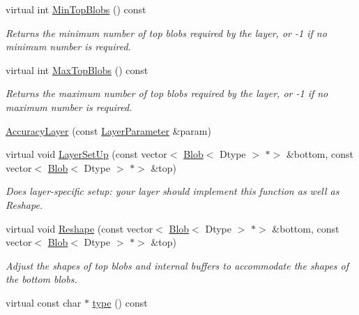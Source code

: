 \begin{DoxyCompactItemize}
virtual int \mbox{\hyperlink{classcaffe_1_1_accuracy_layer_a568dd59acff7a172fa614c88ac56aff7}{Min\+Top\+Blobs}} () const
\begin{DoxyCompactList}\small\item\em Returns the minimum number of top blobs required by the layer, or -\/1 if no minimum number is required. \end{DoxyCompactList}\item 
virtual int \mbox{\hyperlink{classcaffe_1_1_accuracy_layer_a7591ae6d50dd7d96b91241b5b0368997}{Max\+Top\+Blobs}} () const
\begin{DoxyCompactList}\small\item\em Returns the maximum number of top blobs required by the layer, or -\/1 if no maximum number is required. \end{DoxyCompactList}\item 
\mbox{\hyperlink{classcaffe_1_1_accuracy_layer_a362ab61d1961c1b408f84a956f6e598d}{Accuracy\+Layer}} (const \mbox{\hyperlink{classcaffe_1_1_layer_parameter}{Layer\+Parameter}} \&param)
\item 
virtual void \mbox{\hyperlink{classcaffe_1_1_accuracy_layer_a894a1fcb58e8f822f9d875e1acae560c}{Layer\+Set\+Up}} (const vector$<$ \mbox{\hyperlink{classcaffe_1_1_blob}{Blob}}$<$ Dtype $>$ $\ast$$>$ \&bottom, const vector$<$ \mbox{\hyperlink{classcaffe_1_1_blob}{Blob}}$<$ Dtype $>$ $\ast$$>$ \&top)
\begin{DoxyCompactList}\small\item\em Does layer-\/specific setup\+: your layer should implement this function as well as Reshape. \end{DoxyCompactList}\item 
virtual void \mbox{\hyperlink{classcaffe_1_1_accuracy_layer_a1a42bc91c233a9f803482bff30163f36}{Reshape}} (const vector$<$ \mbox{\hyperlink{classcaffe_1_1_blob}{Blob}}$<$ Dtype $>$ $\ast$$>$ \&bottom, const vector$<$ \mbox{\hyperlink{classcaffe_1_1_blob}{Blob}}$<$ Dtype $>$ $\ast$$>$ \&top)
\begin{DoxyCompactList}\small\item\em Adjust the shapes of top blobs and internal buffers to accommodate the shapes of the bottom blobs. \end{DoxyCompactList}\item 
\mbox{\label{classcaffe_1_1_accuracy_layer_a6039b0528a2017c4f9d32ad2c67a9ef2}} 
virtual const char $\ast$ \mbox{\hyperlink{classcaffe_1_1_accuracy_layer_a6039b0528a2017c4f9d32ad2c67a9ef2}{type}} () const

\end{DoxyCompactItemize}
